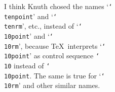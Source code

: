 \def\bs{\char`\\}
I think Knuth chosed the names `{\tt\bs tenpoint}' and `{\tt\bs tenrm}', etc.,
instead of `{\tt\bs10point}' and `{\tt\bs10rm}', because \TeX\ interprets
`{\tt\bs10point}' as control sequence {\tt\bs10} instead of {\tt\bs10point}.
The same is true for `{\tt\bs10rm}' and other similar names.
\bye
